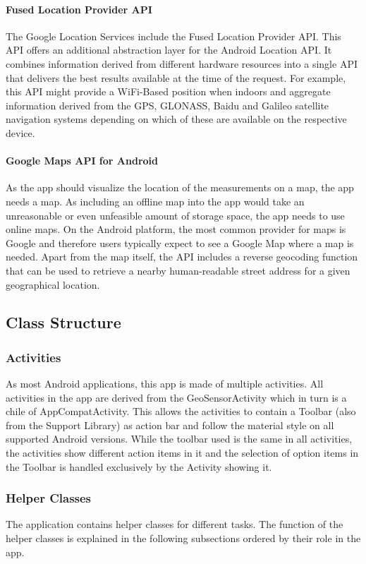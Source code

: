 \paragraph{Fused Location Provider API}
The Google Location Services include the Fused Location Provider API. This API offers an additional abstraction layer for the Android Location API. It combines information derived from different hardware resources into a single API that delivers the best results available at the time of the request. For example, this API might provide a WiFi-Based position when indoors and aggregate information derived from the GPS, GLONASS, Baidu and Galileo satellite navigation systems depending on which of these are available on the respective device. 

\paragraph{Google Maps API for Android}
As the app should visualize the location of the measurements on a map, the app needs a map. As including an offline map into the app would take an unreasonable or even unfeasible amount of storage space, the app needs to use online maps. On the Android platform, the most common provider for maps is Google and therefore users typically expect to see a Google Map where a map is needed. Apart from the map itself, the API includes a reverse geocoding function that can be used to retrieve a nearby human-readable street address for a given geographical location.

\subsection{Class Structure}
\subsubsection{Activities}
As most Android applications, this app is made of multiple activities. All activities in the app are derived from the GeoSensorActivity which in turn is a chile of AppCompatActivity. This allows the activities to contain a Toolbar (also from the Support Library) as action bar and follow the material style on all supported Android versions. While the toolbar used is the same in all activities, the activities show different action items in it and the selection of option items in the Toolbar is handled exclusively by the Activity showing it.

\subsubsection{Helper Classes}
The application contains helper classes for different tasks. The function of the helper classes is explained in the following subsections ordered by their role in the app.


